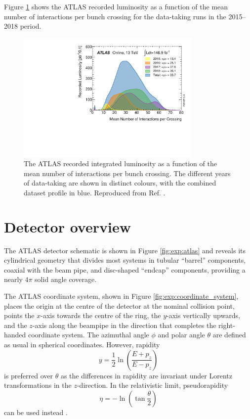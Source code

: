 Figure \ref{fig:exp:pileup} shows the ATLAS recorded luminosity as a
function of the mean number of interactions per bunch crossing for
the data-taking runs in the 2015--2018 period.

\begin{figure}[h]
  \centering
  \includegraphics[width=0.8\textwidth]{figures/experiment/pileup}
  \caption[Mean number of interactions per bunch crossing]{The ATLAS recorded
  integrated luminosity as a function of the mean number
  of interactions per bunch crossing. The different years of data-taking
  are shown in distinct colours, with the combined dataset profile in blue.
  Reproduced from Ref. \cite{pileup}.}
  \label{fig:exp:pileup}
\end{figure}

\section{Detector overview}

The ATLAS detector schematic is shown in Figure \ref{fig:exp:atlas} and
reveals its cylindrical geometry that divides most systems
in tubular ``barrel'' components, coaxial with the beam pipe, 
and disc-shaped ``endcap'' components, providing
a nearly $4\pi$ solid angle coverage.

The ATLAS coordinate system, shown in Figure \ref{fig:exp:coordinate_system}, places
the origin at the centre of the detector at the nominal collision point,
points the $x$-axis towards the centre of the ring, the $y$-axis vertically
upwards, and the $z$-axis along the beampipe in the direction that
completes the right-handed coordinate system. The azimuthal angle $\phi$
and polar angle $\theta$ are defined as usual in spherical coordinates.
However, rapidity
\begin{equation}
y = \frac{1}{2}\ln{\left( \frac{E+p_z}{E-p_z}\right)}
\end{equation}
is preferred over $\theta$ as the differences in rapidity are invariant
under Lorentz transformations in the $z$-direction. In the relativistic
limit, pseudorapidity
\begin{equation}
\eta = - \ln{\left(\tan{\frac{\theta}{2}}\right)}
\end{equation}
can be used instead \cite{Thomson:2013zua}.


